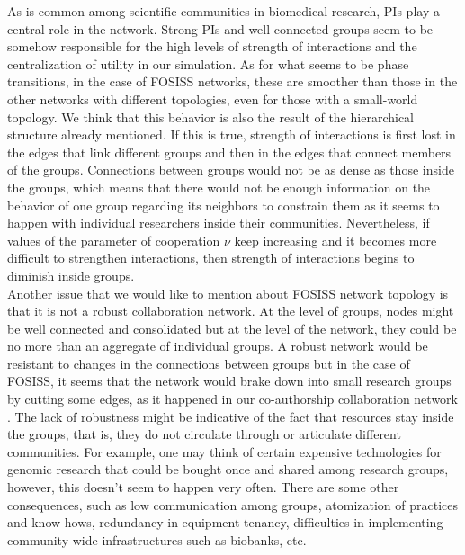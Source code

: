 \documentclass{bmcart}
\begin{document}
 As is common among scientific communities in biomedical
  research, PIs play a central role in the network. Strong PIs and
  well connected groups seem to be somehow responsible for the high
  levels of strength of interactions and the centralization of utility
  in our simulation. As for what seems to be phase transitions, in the
  case of FOSISS networks, these are smoother than those in the other
  networks with different topologies, even for those with a
  small-world topology. We think that this behavior is also the result
  of the hierarchical structure already mentioned. If this is true,
  strength of interactions is first lost in the edges that link
  different groups and then in the edges that connect members of the
  groups. Connections between groups would not be as dense as those
  inside the groups, which means that there would not be enough
  information on the behavior of one group regarding its neighbors to
  constrain them as it seems to happen with individual researchers
  inside their communities. Nevertheless, if values of the parameter
  of cooperation $\nu$ keep increasing and it becomes more difficult to
  strengthen interactions, then strength of interactions begins to
  diminish inside groups.\\

  Another issue that we would like to mention about FOSISS network
  topology is that it is not a robust collaboration network.  At the
  level of groups, nodes might be well connected and consolidated but
  at the level of the network, they could be no more than an aggregate
  of individual groups. A robust network would be resistant to changes
  in the connections between groups but in the case of FOSISS, it
  seems that the network would brake down into small research groups
  by cutting some edges, as it happened in our co-authorship
  collaboration network \cite{HernandezLemus:2013}. The lack of
  robustness might be indicative of the fact that resources stay
  inside the groups, that is, they do not circulate through or
  articulate different communities. For example, one may think of
  certain expensive technologies for genomic research that could be
  bought once and shared among research groups, however, this doesn't
  seem to happen very often. There are some other consequences, such
  as low communication among groups, atomization of practices and
  know-hows, redundancy in equipment tenancy, difficulties in
  implementing community-wide infrastructures such as biobanks,
  etc. \\
\end{document}
